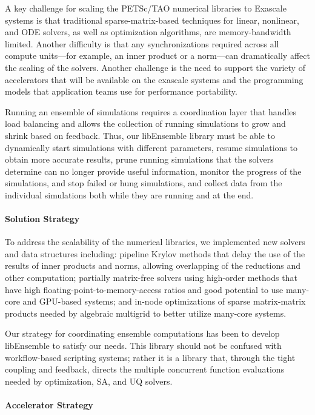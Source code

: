 A key challenge for scaling the PETSc/TAO numerical libraries to Exascale systems is that traditional 
sparse-matrix-based techniques for linear, nonlinear, and ODE solvers, as well as optimization 
algorithms, are memory-bandwidth limited.  Another difficulty is that any synchronizations 
required across all compute units---for example, an inner product or a norm---can 
dramatically affect the scaling of the solvers.  Another challenge is the need to
support the variety of accelerators that will be available on the exascale systems
and the programming models that application teams use for performance
portability.

Running an ensemble of simulations requires a coordination layer that handles load balancing and
allows the collection of running simulations to grow and shrink based on feedback. Thus, our
libEnsemble library must be able to dynamically start simulations with different parameters, 
resume simulations to obtain more accurate results, prune running simulations that the solvers 
determine can no longer provide useful information, monitor the progress of the simulations, 
and stop failed or hung simulations, and collect data from the individual simulations both 
while they are running and at the end.

\paragraph{Solution Strategy}

To address the scalability of the numerical libraries, we implemented new solvers and data 
structures including: pipeline Krylov methods that delay the use of the results of inner 
products and norms, allowing overlapping of the reductions and other computation; partially 
matrix-free solvers using high-order methods that have high floating-point-to-memory-access 
ratios and good potential to use many-core and GPU-based systems; and in-node optimizations 
of sparse matrix-matrix products needed by algebraic multigrid to better utilize many-core 
systems.

Our strategy for coordinating ensemble computations has been to develop libEnsemble
to satisfy our needs.  This library should not be confused with workflow-based 
scripting systems; rather it is a library that, through the tight coupling and 
feedback, directs the multiple concurrent function evaluations needed by 
optimization, SA, and UQ solvers.

\paragraph{Accelerator Strategy}

